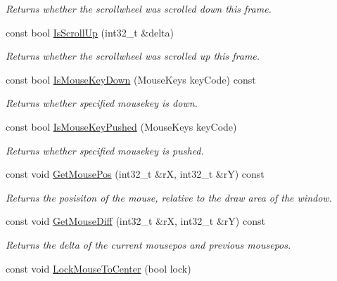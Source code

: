 \begin{DoxyCompactItemize}
\begin{DoxyCompactList}\small\item\em Returns whether the scrollwheel was scrolled down this frame. \end{DoxyCompactList}\item 
const bool \hyperlink{class_ensum_1_1_input_1_1_input_aedaa40538942e4b96a28545dbacafaf3}{Is\+Scroll\+Up} (int32\+\_\+t \&delta)
\begin{DoxyCompactList}\small\item\em Returns whether the scrollwheel was scrolled up this frame. \end{DoxyCompactList}\item 
const bool \hyperlink{class_ensum_1_1_input_1_1_input_aa8dd5973b6b459dc39fed330e10b3df5}{Is\+Mouse\+Key\+Down} (Mouse\+Keys key\+Code) const 
\begin{DoxyCompactList}\small\item\em Returns whether specified mousekey is down. \end{DoxyCompactList}\item 
const bool \hyperlink{class_ensum_1_1_input_1_1_input_af42a6b381d675c41daa6e36078bbaef5}{Is\+Mouse\+Key\+Pushed} (Mouse\+Keys key\+Code)\hypertarget{class_ensum_1_1_input_1_1_input_af42a6b381d675c41daa6e36078bbaef5}{}\label{class_ensum_1_1_input_1_1_input_af42a6b381d675c41daa6e36078bbaef5}

\begin{DoxyCompactList}\small\item\em Returns whether specified mousekey is pushed. \end{DoxyCompactList}\item 
const void \hyperlink{class_ensum_1_1_input_1_1_input_acb4d3ba082c4fd53984768eab378baba}{Get\+Mouse\+Pos} (int32\+\_\+t \&rX, int32\+\_\+t \&rY) const 
\begin{DoxyCompactList}\small\item\em Returns the posisiton of the mouse, relative to the draw area of the window. \end{DoxyCompactList}\item 
const void \hyperlink{class_ensum_1_1_input_1_1_input_aff8bcbdd6fc2c885259b4739d2102a36}{Get\+Mouse\+Diff} (int32\+\_\+t \&rX, int32\+\_\+t \&rY) const \hypertarget{class_ensum_1_1_input_1_1_input_aff8bcbdd6fc2c885259b4739d2102a36}{}\label{class_ensum_1_1_input_1_1_input_aff8bcbdd6fc2c885259b4739d2102a36}

\begin{DoxyCompactList}\small\item\em Returns the delta of the current mousepos and previous mousepos. \end{DoxyCompactList}\item 
const void \hyperlink{class_ensum_1_1_input_1_1_input_aeccd4757b81fa91776006f3193cf1899}{Lock\+Mouse\+To\+Center} (bool lock)\hypertarget{class_ensum_1_1_input_1_1_input_aeccd4757b81fa91776006f3193cf1899}{}\label{class_ensum_1_1_input_1_1_input_aeccd4757b81fa91776006f3193cf1899}


\end{DoxyCompactItemize}

